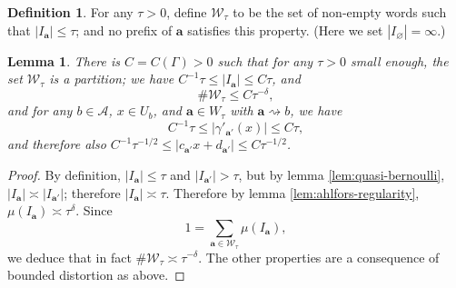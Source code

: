 \documentclass[12pt]{amsart}
\newcommand*\abs[1]{
	\left|#1\right|
}
\newtheorem{lem}{Lemma}[section]
\theoremstyle{definition}
\newtheorem{defn}{Definition}
\renewcommand{\leq}{\leqslant}
\begin{document}
\begin{defn}
For any $\tau > 0$, define $\mathcal{W}_\tau$ to be the set of non-empty words such that $\abs{I_\mathbf{a}} \leq \tau$; and no prefix of $\mathbf{a}$ satisfies this property. (Here we set $\abs{I_{\varnothing}} = \infty$.)
\end{defn}
\begin{lem}
There is $C = C(\Gamma) > 0$ such that for any $\tau > 0$ small enough, the set $\mathcal{W}_\tau$ is a partition; we have 
$C^{-1}\tau \leq \abs{I_\mathbf{a}} \leq C\tau$, and
\[\#\mathcal{W}_\tau \leq C\tau^{-\delta},\]
and for any $b \in \mathcal{A}$, $x \in U_b$, and $\mathbf{a} \in W_\tau$ with $\mathbf{a} \rightsquigarrow b$, we have
\[C^{-1}\tau \leq \abs{\gamma'_{\mathbf{a}'}(x)} \leq C\tau,\]
and therefore also $C^{-1}\tau^{-1/2} \leq \abs{c_{\mathbf{a}'}x + d_{\mathbf{a}'}} \leq C\tau^{-1/2}$.
\end{lem}
\begin{proof}
By definition, $\abs{I_\mathbf{a}} \leq \tau$ and $\abs{I_{\mathbf{a}'}} > \tau$, but by lemma \ref{lem:quasi-bernoulli}, $\abs{I_\mathbf{a}} \asymp \abs{I_{\mathbf{a}'}}$; therefore $\abs{I_\mathbf{a}} \asymp \tau$. Therefore by lemma \ref{lem:ahlfors-regularity}, $\mu(I_\mathbf{a}) \asymp \tau^\delta$. 
Since
\[1 = \sum_{\mathbf{a} \in \mathcal{W}_\tau} \mu(I_\mathbf{a}),\]
we deduce that in fact $\#\mathcal{W}_\tau \asymp \tau^{-\delta}$. The other properties are a consequence of bounded distortion as above.
\end{proof}
\end{document}
